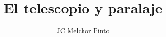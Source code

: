 \documentclass[12pt,addpoints,answers]{guia}
\title{El telescopio y paralaje}
\author{JC Melchor Pinto}
\begin{document}
\INFO%
\begin{questions}
    \questionboxed[25]{}
    \questionboxed[25]{}
\end{questions}
\end{document}
